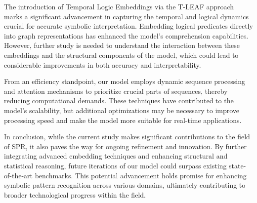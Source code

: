 \documentclass{article}
\begin{document}
The introduction of Temporal Logic Embeddings via the T-LEAF approach marks a significant advancement in capturing the temporal and logical dynamics crucial for accurate symbolic interpretation. Embedding logical predicates directly into graph representations has enhanced the model's comprehension capabilities. However, further study is needed to understand the interaction between these embeddings and the structural components of the model, which could lead to considerable improvements in both accuracy and interpretability.

From an efficiency standpoint, our model employs dynamic sequence processing and attention mechanisms to prioritize crucial parts of sequences, thereby reducing computational demands. These techniques have contributed to the model's scalability, but additional optimizations may be necessary to improve processing speed and make the model more suitable for real-time applications.

In conclusion, while the current study makes significant contributions to the field of SPR, it also paves the way for ongoing refinement and innovation. By further integrating advanced embedding techniques and enhancing structural and statistical reasoning, future iterations of our model could surpass existing state-of-the-art benchmarks. This potential advancement holds promise for enhancing symbolic pattern recognition across various domains, ultimately contributing to broader technological progress within the field.
\end{document}
